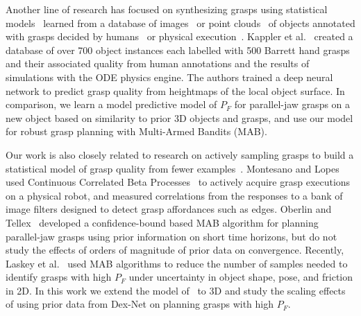 Another line of research has focused on synthesizing grasps using statistical models~\cite{bohg2014data} learned from a database of images~\cite{lenz2015deep} or point clouds~\cite{detry2013learning, herzog2014learning, zhang2011graspable} of objects annotated with grasps decided by humans~\cite{herzog2014learning, lenz2015deep} or physical execution~\cite{herzog2014learning}.
Kappler et al.~\cite{kappler2015leveraging} created a database of over 700 object instances each labelled with 500 Barrett hand grasps and their associated quality from human annotations and the results of simulations with the ODE physics engine.
The authors trained a deep neural network to predict grasp quality from heightmaps of the local object surface.
In comparison, we learn a model predictive model of $P_F$ for parallel-jaw grasps on a new object based on similarity to prior 3D objects and grasps, and use our model for robust grasp planning with Multi-Armed Bandits (MAB).

Our work is also closely related to research on actively sampling grasps to build a statistical model of grasp quality from fewer examples~\cite{detry2011learning, kroemer2010combining, salganicoff1996active}.
Montesano and Lopes~\cite{montesano2012active} used Continuous Correlated Beta Processes~\cite{goetschalckx2011continuous} to actively acquire grasp executions on a physical robot, and measured correlations from the responses to a bank of image filters designed to detect grasp affordances such as edges.
Oberlin and Tellex~\cite{oberlin2015autonomously} developed a confidence-bound based MAB algorithm for planning parallel-jaw grasps using prior information on short time horizons, but do not study the effects of orders of magnitude of prior data on convergence.
Recently, Laskey et al.~\cite{laskey2015bandits} used MAB algorithms to reduce the number of samples needed to identify grasps with high $P_F$ under uncertainty in object shape, pose, and friction in 2D.
In this work we extend the model of~\cite{laskey2015bandits} to 3D and study the scaling effects of using prior data from Dex-Net on planning grasps with high $P_F$.


